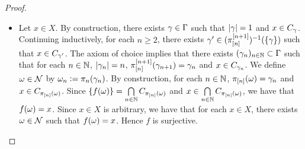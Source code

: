 \documentclass{book}
\begin{document}
\begin{proof}
\begin{itemize}
\begin{align*}
				& \subset C_{\pi_{[N]}(\om_k)} \\
				& = C_{\pi_{[N]}(\om)}.
			\end{align*}
			and therefore
			\begin{align*}
				d(f(\om_k), f(\om))
				& \leq \diam C_{\pi_{[N]}(\om)} \\
				& \leq N^{-1} \\
				& < \ep.
			\end{align*}
			Since $k \in \N$ with $k \geq K$ is arbitrary, we have that for each $k \in \N$, $k \geq K$ implies that $d(f(\om_k), f(\om)) < \ep$. Since $\ep > 0$ is arbitrary, we have that for each $\ep >0$, there exists $K \in \N$ such that for each $k \in \N$, $k \geq K$ implies that $d(f(\om_k), f(\om)) < \ep$. Hence $d(f(\om_k), f(\om)) \rightarrow 0$ and $f(\om_k) \rightarrow f(\om)$. Since $(\om_k)_{k \in \N} \subset \MN$ and $\om \in \MN$ are arbitrary, we have that for each $(\om_k)_{k \in \N} \subset \MN$ and $\om \in \MN$, $\om_k \rightarrow \om$ implies that $f(\om_k) \rightarrow f(\om)$. Thus $f$ is continuous. 
			\item Let $x \in X$. By construction, there exists $\gamma \in \Gamma$ such that $|\gamma| = 1$ and $x \in C_{\gamma}$. Continuing inductively, for each $n \geq 2$, there exists $\gamma' \in (\pi^{[n+1]}_{[n]})^{-1}(\{\gamma\})$ such that $x \in C_{\gamma'}$. The axiom of choice implies that there exists $(\gamma_n)_{n \in \mathbb{N}} \subset \Gamma$ such that for each $n \in \mathbb{N}$, $|\gamma_n| = n$, $\pi^{[n+1]}_{[n]}(\gamma_{n+1}) = \gamma_n$ and $x \in C_{\gamma_n}$. We define $\om \in \MN$ by $\omega_n \vcentcolon= \pi_n(\gamma_n)$. By construction, for each $n \in \mathbb{N}$, $\pi_{[n]}(\omega) = \gamma_n$ and $x \in C_{\pi_{[n]}(\omega)}$. Since $\{f(\omega)\} = \bigcap\limits_{n \in \mathbb{N}} C_{\pi_{[n]}(\omega)}$ and $x \in \bigcap\limits_{n \in \mathbb{N}} C_{\pi_{[n]}(\omega)}$, we have that $f(\omega) = x$. Since $x \in X$ is arbitrary, we have that for each $x \in X$, there exists $\om \in \MN$ such that $f(\omega) = x$. Hence $f$ is surjective.
		\end{itemize}
	\end{proof}
	
\end{document}
